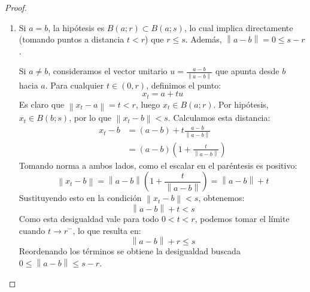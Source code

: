 \documentclass{article}
\theoremstyle{definition}
\newcommand{\norm}[1]{\left\lVert #1 \right\rVert}       %
\newcommand{\bola}[2]{B(#1;#2)}                           %
\begin{document}
\begin{proof}
\begin{enumerate}
        \item Si \( a = b \), la hipótesis es \( \bola{a}{r} \subset \bola{a}{s} \), lo cual implica directamente (tomando puntos a distancia \( t < r \)) que \( r \leq s \). Además, \( \norm{a-b} = 0 \leq s - r \).

              Si \( a \neq b \), consideramos el vector unitario \( u = \frac{a-b}{\norm{a-b}} \) que apunta desde \( b \) hacia \( a \). Para cualquier \( t \in (0, r) \), definimos el punto:
              \[
                  x_t = a + tu
              \]
              Es claro que \( \norm{x_t - a} = t < r \), luego \( x_t \in \bola{a}{r} \). Por hipótesis, \( x_t \in \bola{b}{s} \), por lo que \( \norm{x_t - b} < s \). Calculamos esta distancia:
              \begin{align*}
                  x_t - b & = (a - b) + t\frac{a-b}{\norm{a-b}}            \\
                          & = (a-b)\left( 1 + \frac{t}{\norm{a-b}} \right)
              \end{align*}
              Tomando norma a ambos lados, como el escalar en el paréntesis es positivo:
              \[
                  \norm{x_t - b} = \norm{a-b} \left( 1 + \frac{t}{\norm{a-b}} \right) = \norm{a-b} + t
              \]
              Sustituyendo esto en la condición \( \norm{x_t - b} < s \), obtenemos:
              \[
                  \norm{a-b} + t < s
              \]
              Como esta desigualdad vale para todo \( 0 < t < r \), podemos tomar el límite cuando \( t \to r^- \), lo que resulta en:
              \[
                  \norm{a-b} + r \leq s
              \]
              Reordenando los términos se obtiene la desigualdad buscada \( 0 \leq \norm{a-b} \leq s - r \).
    \end{enumerate}
\end{proof}

\vspace{0.5cm}
\end{document}
